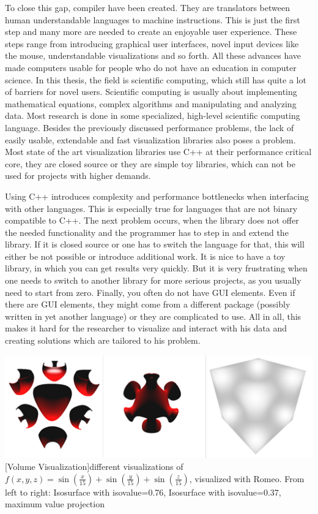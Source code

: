 To close this gap, compiler have been created. They are translators between human understandable languages to machine instructions.
This is just the first step and many more are needed to create an enjoyable user experience.
These steps range from introducing graphical user interfaces, novel input devices like the mouse, understandable visualizations and so forth.
All these advances have made computers usable for people who do not have an education in computer science.
In this thesis, the field is scientific computing, which still has quite a lot of barriers for novel users.
Scientific computing is usually about implementing mathematical equations, complex algorithms and manipulating and analyzing data.
Most research is done in some specialized, high-level scientific computing language.
Besides the previously discussed performance problems, the lack of easily usable, extendable and fast visualization libraries also poses a problem.
Most state of the art visualization libraries use C++ at their performance critical core, they are closed source or they are simple toy libraries, which can not be used for projects with higher demands.

Using C++ introduces complexity and performance bottlenecks when interfacing with other languages. This is especially true for languages that are not binary compatible to C++. 
The next problem occurs, when the library does not offer the needed functionality and the programmer has to step in and extend the library. If it is closed source or one has to switch the language for that, this will either be not possible or introduce additional work. 
It is nice to have a toy library, in which you can get results very quickly. But it is very frustrating when one needs to switch to another library for more serious projects, as you usually need to start from zero.
Finally, you often do not have GUI elements. 
Even if there are GUI elements, they might come from a different package (possibly written in yet another language) or they are complicated to use.
All in all, this makes it hard for the researcher to visualize and interact with his data and creating solutions which are tailored to his problem.

\vspace{1em}
\begin{minipage}{\linewidth}
    \centering
    \includegraphics[width=0.7\linewidth]{graphics/surfaces.png}
    [Volume Visualization]{different visualizations of $f(x,y,z)=\sin(\frac{x}{15})+\sin(\frac{y}{15})+\sin(\frac{z}{15})$, visualized with Romeo. From left to right: Isosurface with isovalue=0.76, Isosurface with isovalue=0.37, maximum value projection}
    \label{fig:volume}
\end{minipage}
\vspace{1em}

